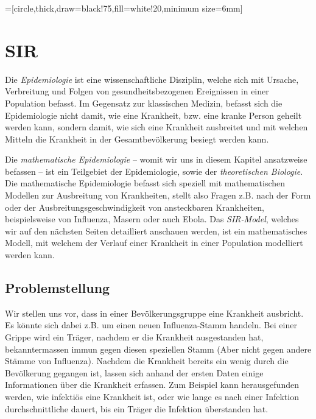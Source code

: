 \usetikzlibrary{arrows,shapes,snakes,automata,backgrounds,petri}
=[circle,thick,draw=black!75,fill=white!20,minimum size=6mm]

\chapter{SIR\label{chapter:sir}}
\begin{refsection}

Die \emph{Epidemiologie} ist eine wissenschaftliche Disziplin, welche sich mit Ursache, Verbreitung und Folgen von gesundheitsbezogenen Ereignissen in einer Population befasst.
Im Gegensatz zur klassischen Medizin, befasst sich die Epidemiologie nicht damit, wie eine Krankheit, bzw. eine kranke Person geheilt werden kann, sondern damit, wie sich eine Krankheit ausbreitet und mit welchen Mitteln die Krankheit in der Gesamtbevölkerung besiegt werden kann.

Die \emph{mathematische Epidemiologie} -- womit wir uns in diesem Kapitel ansatzweise befassen -- ist ein Teilgebiet der Epidemiologie, sowie der \emph{theoretischen Biologie}.
Die mathematische Epidemiologie befasst sich speziell mit mathematischen Modellen zur Ausbreitung von Krankheiten, stellt also Fragen z.B. nach der Form oder der Ausbreitungsgeschwindigkeit von ansteckbaren Krankheiten, beispielsweise von Influenza, Masern oder auch Ebola. 
Das \emph{SIR-Model}, welches wir auf den nächsten Seiten detailliert anschauen werden, ist ein mathematisches Modell, mit welchem der Verlauf einer Krankheit in einer Population modelliert werden kann.

\section{Problemstellung}
Wir stellen uns vor, dass in einer Bevölkerungsgruppe eine Krankheit ausbricht. 
Es könnte sich dabei z.B. um einen neuen Influenza-Stamm handeln.
Bei einer Grippe wird ein Träger, nachdem er die Krankheit ausgestanden hat, bekanntermassen immun gegen diesen speziellen Stamm (Aber nicht gegen andere Stämme von Influenza).
Nachdem die Krankheit bereits ein wenig durch die Bevölkerung gegangen ist, lassen sich anhand der ersten Daten einige Informationen über die Krankheit erfassen.
Zum Beispiel kann herausgefunden werden, wie infektiös eine Krankheit ist, oder wie lange es nach einer Infektion durchschnittliche dauert, bis ein Träger die Infektion überstanden hat.


\end{refsection}
